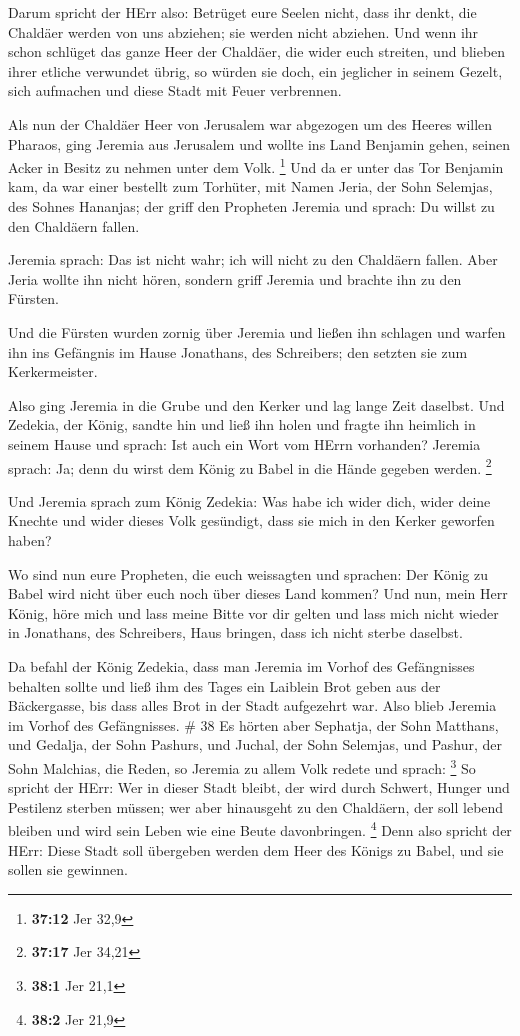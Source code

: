  Darum spricht der HErr also: Betrüget eure Seelen nicht,
dass ihr denkt, die Chaldäer werden von uns abziehen; sie werden nicht
abziehen.  Und wenn ihr schon schlüget das ganze Heer der
Chaldäer, die wider euch streiten, und blieben ihrer etliche verwundet
übrig, so würden sie doch, ein jeglicher in seinem Gezelt, sich
aufmachen und diese Stadt mit Feuer verbrennen.

 Als nun der Chaldäer Heer von Jerusalem war abgezogen um
des Heeres willen Pharaos,  ging Jeremia aus Jerusalem und
wollte ins Land Benjamin gehen, seinen Acker in Besitz zu nehmen unter
dem Volk. \footnote{\textbf{37:12} Jer 32,9}  Und da er
unter das Tor Benjamin kam, da war einer bestellt zum Torhüter, mit
Namen Jeria, der Sohn Selemjas, des Sohnes Hananjas; der griff den
Propheten Jeremia und sprach: Du willst zu den Chaldäern fallen.

 Jeremia sprach: Das ist nicht wahr; ich will nicht zu den
Chaldäern fallen. Aber Jeria wollte ihn nicht hören, sondern griff
Jeremia und brachte ihn zu den Fürsten.

 Und die Fürsten wurden zornig über Jeremia und ließen ihn
schlagen und warfen ihn ins Gefängnis im Hause Jonathans, des
Schreibers; den setzten sie zum Kerkermeister.

 Also ging Jeremia in die Grube und den Kerker und lag
lange Zeit daselbst.  Und Zedekia, der König, sandte hin
und ließ ihn holen und fragte ihn heimlich in seinem Hause und sprach:
Ist auch ein Wort vom HErrn vorhanden? Jeremia sprach: Ja; denn du wirst
dem König zu Babel in die Hände gegeben werden. \footnote{\textbf{37:17}
  Jer 34,21}

 Und Jeremia sprach zum König Zedekia: Was habe ich wider
dich, wider deine Knechte und wider dieses Volk gesündigt, dass sie mich
in den Kerker geworfen haben?

 Wo sind nun eure Propheten, die euch weissagten und
sprachen: Der König zu Babel wird nicht über euch noch über dieses Land
kommen?  Und nun, mein Herr König, höre mich und lass meine
Bitte vor dir gelten und lass mich nicht wieder in Jonathans, des
Schreibers, Haus bringen, dass ich nicht sterbe daselbst.

 Da befahl der König Zedekia, dass man Jeremia im Vorhof
des Gefängnisses behalten sollte und ließ ihm des Tages ein Laiblein
Brot geben aus der Bäckergasse, bis dass alles Brot in der Stadt
aufgezehrt war. Also blieb Jeremia im Vorhof des Gefängnisses. \# 38
 Es hörten aber Sephatja, der Sohn Matthans, und Gedalja,
der Sohn Pashurs, und Juchal, der Sohn Selemjas, und Pashur, der Sohn
Malchias, die Reden, so Jeremia zu allem Volk redete und sprach:
\footnote{\textbf{38:1} Jer 21,1}  So spricht der HErr: Wer
in dieser Stadt bleibt, der wird durch Schwert, Hunger und Pestilenz
sterben müssen; wer aber hinausgeht zu den Chaldäern, der soll lebend
bleiben und wird sein Leben wie eine Beute davonbringen. \footnote{\textbf{38:2}
  Jer 21,9}  Denn also spricht der HErr: Diese Stadt soll
übergeben werden dem Heer des Königs zu Babel, und sie sollen sie
gewinnen.


